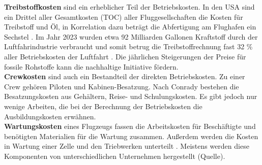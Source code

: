 %
\textbf{Treibstoffkosten} sind ein erheblicher Teil der Betriebskosten. 
In den USA sind ein Drittel aller Gesamtkosten (TOC) aller Fluggesellschaften 
die Kosten für Treibstoff und Öl, in Korrelation dazu beträgt 
die Abfertigung am Flughafen ein Sechstel \cite{conrady2019luftverkehr}. 
Im Jahr 2023 wurden etwa 92 Milliarden Gallonen Kraftstoff durch der 
Luftfahrindustrie verbraucht und somit betrug die Treibstoffrechnung fast 32 \% 
aller Betriebskosten der Luftfahrt \cite{iata_industry_statistics_2024}.
Die jährlichen Steigerungen der Preise für fossile Rohstoffe kann die nachhaltige Initiative fördern. \\
%
%
%
\textbf{Crewkosten} sind auch ein Bestandteil der direkten Betriebskosten. 
Zu einer Crew gehören Piloten und Kabinen-Besatzung.
Nach Conrady \cite{conrady2019luftverkehr} bestehen die Besatzungskosten aus 
Gehältern, Reise- und Schulungskosten. Es gibt jedoch nur wenige Arbeiten, 
die bei der Berechnung der Betriebskosten die Ausbildungskosten erwähnen. \\
%
\textbf{Wartungskosten} eines Flugzeugs fassen die Arbeitskosten für Beschäftigte
und benötigten Materialien für die Wartung zusammen.
Außerdem werden die Kosten in Wartung einer Zelle und den Triebwerken unterteilt \cite{wang2021research}. 
Meistens werden diese Komponenten von unterschiedlichen Unternehmen hergestellt (Quelle).
